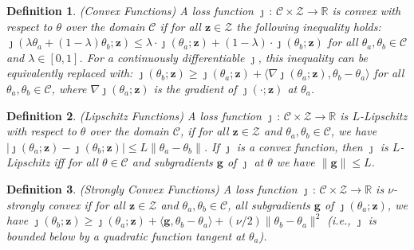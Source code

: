 \documentclass{article}
\theoremstyle{plain}
\newtheorem{definition}{Definition}
\def \y {\mathbf y}
\def \z {\mathbf z}
\def \CCC {\mathcal{C}}
\def \ZZZ {\mathcal{Z}}
\def \g {\mathbf g}
\def \x {\mathbf x}
\def \R {\mathbb{R}}
\begin{document}
\begin{definition} (Convex Functions) A loss function $\jmath \,:\, \CCC \times \ZZZ \rightarrow \R$ is convex with respect to $\theta$ over the domain $\CCC$ if for all $\z \in \ZZZ$ the following inequality holds: $\jmath(\lambda\theta_a + (1-\lambda)\theta_b;\z) \leq \lambda\cdot \jmath(\theta_a;\z)+(1-\lambda) \cdot \jmath(\theta_b;\z)$ for all $\theta_a,\theta_b \in \CCC$ and $\lambda \in [0,1]$. For a continuously differentiable $\jmath$, this inequality can be equivalently replaced with: $\jmath(\theta_b;\z) \geq  \jmath(\theta_a;\z) + \langle \nabla \jmath(\theta_a;\z), \theta_b - \theta_a \rangle$ for all $\theta_a,\theta_b \in \CCC$, where $\nabla \jmath(\theta_a;\z)$ is the gradient of $\jmath(\cdot;\z)$ at $\theta_a$.
\end{definition}


\begin{definition} (Lipschitz Functions) \label{defn:Lipsfunc}
A loss function $\jmath \,:\, \CCC \times \ZZZ \rightarrow \R$ is $L$-Lipschitz with respect to $\theta$ over the domain $\CCC$, if for all $\z \in \ZZZ$ and $\theta_a,\theta_b \in \CCC$, we have $|\jmath(\theta_a;\z) - \jmath(\theta_b;\z) | \leq L \| \theta_a - \theta_b \|$. If $\jmath$ is a convex function, then $\jmath$ is $L$-Lipschitz iff for all $\theta \in \CCC$ and subgradients $\g$ of $\jmath$ at $\theta$ we have $\| \g \| \leq L$.
\end{definition}

\begin{definition} (Strongly Convex Functions) \label{defn:strongconvex}
A loss function $\jmath \,:\, \CCC \times \ZZZ \rightarrow \R$ is $\nu$-strongly convex if for all $\z \in \ZZZ$ and $\theta_a, \theta_b \in \CCC$, all subgradients $\g$ of $\jmath(\theta_a;\z)$, we have $\jmath(\theta_b;\z) \geq \jmath(\theta_a;\z) + \langle \g, \theta_b-\theta_a \rangle + (\nu/2) \| \theta_b - \theta_a \|^2$  (i.e., $\jmath$ is bounded below by a quadratic function tangent at $\theta_a$).
\end{definition}
\end{document}
